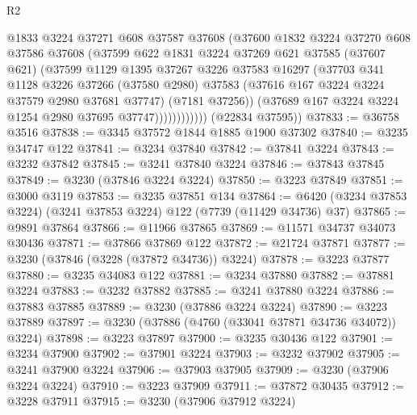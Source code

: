 \begin{lexlean}{R2}
\begin{coremodule}
                      @1833
                      @3224
                      @37271
                      @608
                      @37587
                      @37608
                      (@37600
                        @1832
                        @3224
                        @37270
                        @608
                        @37586
                        @37608
                        (@37599
                          @622
                          @1831
                          @3224
                          @37269
                          @621
                          @37585
                          (@37607 @621)
                          (@37599
                            @1129
                            @1395
                            @37267
                            @3226
                            @37583
                            @16297
                            (@37703
                              @341
                              @1128
                              @3226
                              @37266
                              (@37580 @2980)
                              @37583
                              (@37616 @167 @3224 @3224 @37579 @2980 @37681 @37747)
                              (@7181 @37256))
                            (@37689 @167 @3224 @3224 @1254 @2980 @37695 @37747))))))))))))
      (@22834 @37595))
@37833 := @36758 @3516
@37838 := @3345 @37572 @1844 @1885 @1900 @37302
@37840 := @3235 @34747 @122
@37841 := @3234 @37840
@37842 := @37841 @3224
@37843 := @3232 @37842
@37845 := @3241 @37840 @3224
@37846 := @37843 @37845
@37849 := @3230 (@37846 @3224 @3224)
@37850 := @3223 @37849
@37851 := @3000 @3119
@37853 := @3235 @37851 @134
@37864 := @6420 (@3234 @37853 @3224) (@3241 @37853 @3224) @122 (@7739 (@11429 @34736) @37)
@37865 := @9891 @37864
@37866 := @11966 @37865
@37869 := @11571 @34737 @34073 @30436
@37871 := @37866 @37869 @122
@37872 := @21724 @37871
@37877 := @3230 (@37846 (@3228 (@37872 @34736)) @3224)
@37878 := @3223 @37877
@37880 := @3235 @34083 @122
@37881 := @3234 @37880
@37882 := @37881 @3224
@37883 := @3232 @37882
@37885 := @3241 @37880 @3224
@37886 := @37883 @37885
@37889 := @3230 (@37886 @3224 @3224)
@37890 := @3223 @37889
@37897 := @3230 (@37886 (@4760 (@33041 @37871 @34736 @34072)) @3224)
@37898 := @3223 @37897
@37900 := @3235 @30436 @122
@37901 := @3234 @37900
@37902 := @37901 @3224
@37903 := @3232 @37902
@37905 := @3241 @37900 @3224
@37906 := @37903 @37905
@37909 := @3230 (@37906 @3224 @3224)
@37910 := @3223 @37909
@37911 := @37872 @30435
@37912 := @3228 @37911
@37915 := @3230 (@37906 @37912 @3224)

\end{coremodule}
\end{lexlean}
